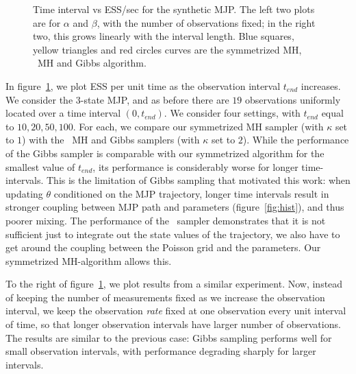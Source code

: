 \begin{figure}[H]
\begin{minipage}[hp]{0.24\linewidth}
  \end{minipage}
  \caption{Time interval vs ESS/sec for the synthetic MJP. The left two plots are for $\alpha$ and $\beta$, with the number of observations fixed; in the right two, this grows linearly with the interval length. {Blue squares, yellow triangles and red circles curves} are the symmetrized MH, \naive\ MH and Gibbs algorithm.
  }
     \label{fig:TSS}
  \end{figure}
In figure~\ref{fig:TSS}, we plot ESS per unit time as the observation interval $t_{end}$ increases. 
We consider the 3-state MJP, and as before there are $19$ observations uniformly located over a time interval $(0,t_{end})$.
We consider four settings, with $t_{end}$ equal to $10, 20, 50, 100$. 
For each, we compare our symmetrized MH sampler (with $\kappa$ set to $1$) with the \naive\ MH and Gibbs samplers (with $\kappa$ set to $2$). 
While the performance of the Gibbs sampler is comparable with our symmetrized algorithm for the smallest value of $t_{end}$, its performance is considerably worse for longer time-intervals.  
This is the limitation of Gibbs sampling that motivated this work: when updating $\theta$ conditioned on the MJP trajectory, longer time intervals result in stronger coupling between MJP path and parameters (figure~\ref{fig:hist}), and thus poorer mixing. 
The performance of the \naive\ sampler demonstrates that it is not sufficient just to integrate out the state values of the trajectory, we also have to get around the coupling between the Poisson grid and the parameters. 
Our symmetrized MH-algorithm allows this. 


To the right of figure~\ref{fig:TSS}, we plot results from a similar experiment. 
Now, instead of keeping the number of measurements fixed as we increase the observation interval, we keep the observation {\em rate} fixed at one observation every unit interval of time, so that longer observation intervals have larger number of observations. 
The results are similar to the previous case: Gibbs sampling performs well for small observation intervals, with performance degrading sharply for larger intervals. 

